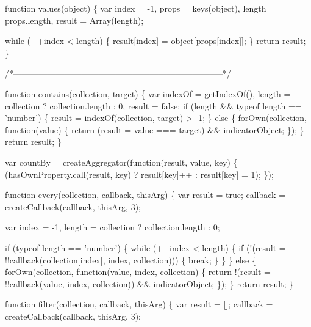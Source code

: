 \begin{DoxyCodeInclude}
{{  \textcolor{keyword}{function} values(\textcolor{keywordtype}{object}) \{
    var index = -1,
        props = keys(\textcolor{keywordtype}{object}),
        length = props.length,
        result = Array(length);

    \textcolor{keywordflow}{while} (++index < length) \{
      result[index] = \textcolor{keywordtype}{object}[props[index]];
    \}
    \textcolor{keywordflow}{return} result;
  \}

  \textcolor{comment}{/*--------------------------------------------------------------------------*/}

  \textcolor{keyword}{function} contains(collection, target) \{
    var indexOf = getIndexOf(),
        length = collection ? collection.length : 0,
        result = \textcolor{keyword}{false};
    \textcolor{keywordflow}{if} (length && typeof length == \textcolor{stringliteral}{'number'}) \{
      result = indexOf(collection, target) > -1;
    \} \textcolor{keywordflow}{else} \{
      forOwn(collection, \textcolor{keyword}{function}(value) \{
        \textcolor{keywordflow}{return} (result = value === target) && indicatorObject;
      \});
    \}
    \textcolor{keywordflow}{return} result;
  \}

  var countBy = createAggregator(\textcolor{keyword}{function}(result, value, key) \{
    (hasOwnProperty.call(result, key) ? result[key]++ : result[key] = 1);
  \});

  \textcolor{keyword}{function} every(collection, callback, thisArg) \{
    var result = \textcolor{keyword}{true};
    callback = createCallback(callback, thisArg, 3);

    var index = -1,
        length = collection ? collection.length : 0;

    \textcolor{keywordflow}{if} (typeof length == \textcolor{stringliteral}{'number'}) \{
      \textcolor{keywordflow}{while} (++index < length) \{
        \textcolor{keywordflow}{if} (!(result = !!callback(collection[index], index, collection))) \{
          \textcolor{keywordflow}{break};
        \}
      \}
    \} \textcolor{keywordflow}{else} \{
      forOwn(collection, \textcolor{keyword}{function}(value, index, collection) \{
        \textcolor{keywordflow}{return} !(result = !!callback(value, index, collection)) && indicatorObject;
      \});
    \}
    \textcolor{keywordflow}{return} result;
  \}

  \textcolor{keyword}{function} filter(collection, callback, thisArg) \{
    var result = [];
    callback = createCallback(callback, thisArg, 3);

}}
\end{DoxyCodeInclude}
